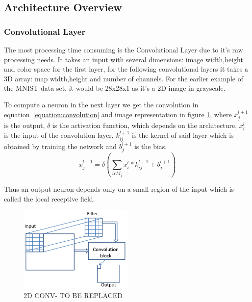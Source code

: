  \subsection{Architecture Overview}
 \label{section:Aoverview}



 \subsubsection{Convolutional Layer}
\label{section:convlayer}

\quad The most processing time consuming  is the Convolutional Layer due to it's raw processing needs. 
It takes an input with several dimensions: image width,height and color space for the first layer,
for the following convolutional layers it takes a 3D array: map width,height and number of channels.
For the earlier example of the MNIST
data set, it would be 28x28x1 as it's a 2D image in grayscale.

To compute a neuron in the next layer we get the convolution in equation~\ref{equation:convolution} and image representation in figure \ref{Cl},
where $x_{j}^{l+1}$ is the output, $\delta$ is the activation function, which depends on the architecture, $x_{i}^{l}$ is the input of the convolution layer, $k_{ij}^{l+1}$ is
the kernel of said layer which is obtained by training the network and $b_{j}^{l+1}$ is the bias.
\begin{equation} \label{equation:convolution}
    \displaystyle x_{j}^{l+1}=\delta (\sum_{i \epsilon M_{j}}x_{i}^{l} * k_{ij}^{l+1}+ b_{j}^{l+1})
\end{equation}

Thus an output neuron depends only on a small region of the input which is called the local receptive field. 

\begin{figure}[!htbp]
    \centering
    \includegraphics[width=0.5\textwidth]{Figures/convolution.png}
    \caption{2D CONV- TO BE REPLACED}
    \label{Cl}
\end{figure} 

